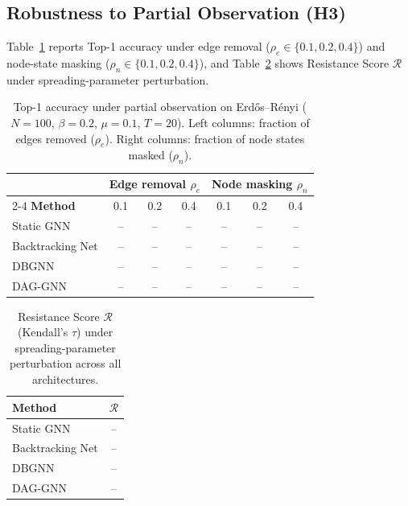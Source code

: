 
\subsection{Robustness to Partial Observation (H3)}
\label{ssst:robustness}

Table~\ref{tab:robustness} reports Top-1 accuracy under edge removal
($\rho_e \in \{0.1, 0.2, 0.4\}$) and node-state masking
($\rho_n \in \{0.1, 0.2, 0.4\}$), and Table~\ref{tab:resistance} shows
Resistance Score $\mathcal{R}$ under spreading-parameter perturbation.

\begin{table}[htbp]
  \centering
  \caption{Top-1 accuracy under partial observation on Erd\H{o}s--R\'enyi
           ($N=100$, $\beta=0.2$, $\mu=0.1$, $T=20$).
           Left columns: fraction of edges removed ($\rho_e$).
           Right columns: fraction of node states masked ($\rho_n$).}
  \label{tab:robustness}
  \begin{tabular}{lcccccc}
    \hline
    & \multicolumn{3}{c}{\textbf{Edge removal} $\rho_e$}
    & \multicolumn{3}{c}{\textbf{Node masking} $\rho_n$} \\
    \cline{2-4}\cline{5-7}
    \textbf{Method} & 0.1 & 0.2 & 0.4 & 0.1 & 0.2 & 0.4 \\
    \hline
    Static GNN       & -- & -- & -- & -- & -- & -- \\
    Backtracking Net & -- & -- & -- & -- & -- & -- \\
    DBGNN            & -- & -- & -- & -- & -- & -- \\
    DAG-GNN          & -- & -- & -- & -- & -- & -- \\
    \hline
  \end{tabular}
\end{table}

\begin{table}[htbp]
  \centering
  \caption{Resistance Score $\mathcal{R}$ (Kendall's $\tau$) under
           spreading-parameter perturbation across all architectures.}
  \label{tab:resistance}
  \begin{tabular}{lc}
    \hline
    \textbf{Method} & $\mathcal{R}$ \\
    \hline
    Static GNN       & -- \\
    Backtracking Net & -- \\
    DBGNN            & -- \\
    DAG-GNN          & -- \\
    \hline
  \end{tabular}
\end{table}

